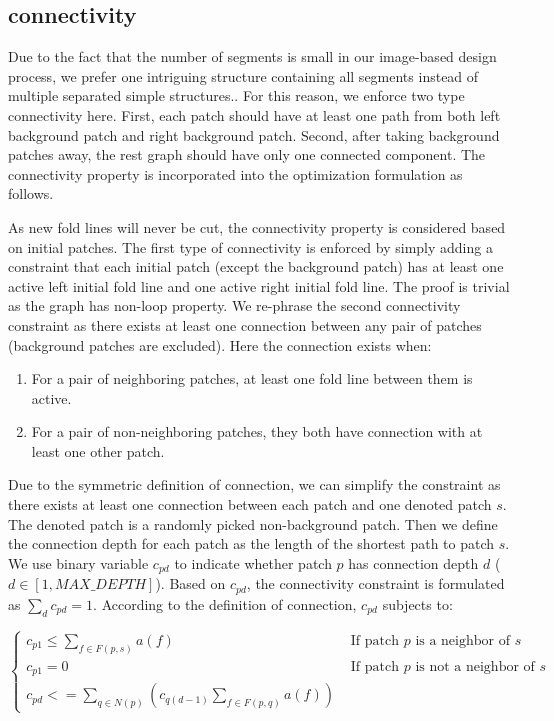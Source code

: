 \subsection{connectivity}
Due to the fact that the number of segments is small in our image-based design process, we prefer one intriguing structure containing all segments instead of multiple separated simple structures.. For this reason, we enforce two type connectivity here. First, each patch should have at least one path from both left background patch and right background patch. Second, after taking background patches away, the rest graph should have only one connected component. The connectivity property is incorporated into the optimization formulation as follows.

As new fold lines will never be cut, the connectivity property is considered based on initial patches. The first type of connectivity is enforced by simply adding a constraint that each initial patch (except the background patch) has at least one active left initial fold line and one active right initial fold line. The proof is trivial as the graph has non-loop property. We re-phrase the second connectivity constraint as there exists at least one connection between any pair of patches (background patches are excluded). Here the connection exists when:

\begin{enumerate}
\item For a pair of neighboring patches, at least one fold line between them is active.
\item For a pair of non-neighboring patches, they both have connection with at least one other patch.
\end{enumerate}

Due to the symmetric definition of connection, we can simplify the constraint as there exists at least one connection between each patch and one denoted patch $s$. The denoted patch is a randomly picked non-background patch. Then we define the connection depth for each patch as the length of the shortest path to patch $s$. We use binary variable $c_{pd}$ to indicate whether patch $p$ has connection depth $d$ ($d \in [1, MAX\_DEPTH]$). Based on $c_{pd}$, the connectivity constraint is formulated as $\sum_d{c_{pd}} = 1$. According to the definition of connection, $c_{pd}$ subjects to:

\begin{equation*}
  \begin{cases}
    c_{p1} \leq \sum_{f \in F(p, s)}a(f) & \text{ If patch $p$ is a neighbor of $s$} \\
    c_{p1} = 0 & \text{ If patch $p$ is not a neighbor of $s$} \\
    c_{pd} <= \sum_{q \in N(p)}(c_{q(d-1)}\sum_{f \in F(p, q)}a(f))
  \end{cases}
\end{equation*}

